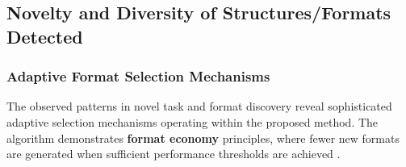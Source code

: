 


\subsection{Novelty and Diversity of Structures/Formats Detected}\label{novelty_diversity_of_structures}

\subsubsection{Adaptive Format Selection Mechanisms}

The observed patterns in novel task and format discovery reveal sophisticated adaptive selection mechanisms operating within the proposed method. The algorithm demonstrates \textbf{format economy} principles, where fewer new formats are generated when sufficient performance thresholds are achieved \cite{snyder2025effect}.





